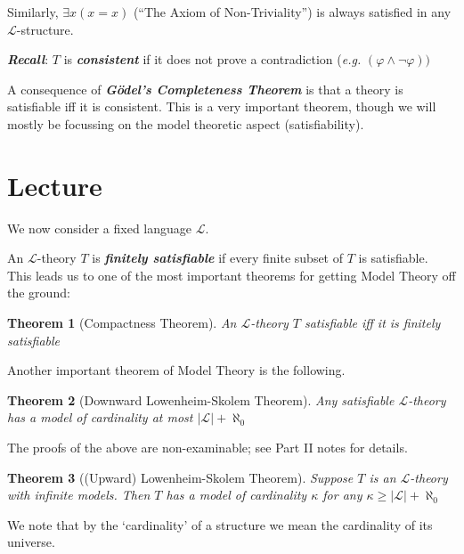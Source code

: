 \documentclass[]{article}
\theoremstyle{custhm}
\theoremstyle{cusdef}
\theoremstyle{custhm}
\theoremstyle{custhm}
\theoremstyle{custhm}
\theoremstyle{ex}
\theoremstyle{custhm}
\newtheorem*{theorem*}{Theorem}
\theoremstyle{cusdef}
\theoremstyle{remark}
\theoremstyle{remark}
\theoremstyle{numremark}
\newcommand{\undf}[1]{\textit{\textbf{#1}}}
\renewcommand{\L}{\mathcal{L}}
\renewcommand{\it}[1]{\textit{#1}}
\renewcommand{\phi}{\varphi}
\renewcommand{\lnot}{\neg}
\begin{document}
Similarly, $\exists x(x=x)$ (``The Axiom of Non-Triviality'') is always satisfied in any $\L$-structure.

\undf{Recall}: $T$ is \undf{consistent} if it does not prove a contradiction (\it{e.g.} $(\phi\land\lnot\phi))$

A consequence of \undf{G{\"o}del's Completeness Theorem} is that a theory is satisfiable iff it is consistent. This is a very important theorem, though we will mostly be focussing on the model theoretic aspect (satisfiability).

\section{Lecture}

We now consider a fixed language $\L$.

An $\L$-theory $T$ is \undf{finitely satisfiable} if every finite subset of $T$ is satisfiable. This leads us to one of the most important theorems for getting Model Theory off the ground:

\begin{theorem*}[Compactness Theorem]
An $\L$-theory $T$ satisfiable iff it is finitely satisfiable
\end{theorem*}

Another important theorem of Model Theory is the following.

\begin{theorem*}[Downward Lowenheim-Skolem Theorem]
	Any satisfiable $\L$-theory has a model of cardinality at most $|\L|+\aleph_0$
\end{theorem*}

The proofs of the above are non-examinable; see Part II notes for details.

\begin{theorem*}[(Upward) Lowenheim-Skolem  Theorem]
Suppose $T$ is an $\L$-theory with infinite models. Then $T$ has a model of cardinality $\kappa$ for any $\kappa \ge |\L|+\aleph_0$
\end{theorem*}

We note that by the `cardinality' of a structure we mean the cardinality of its universe.
\end{document}
